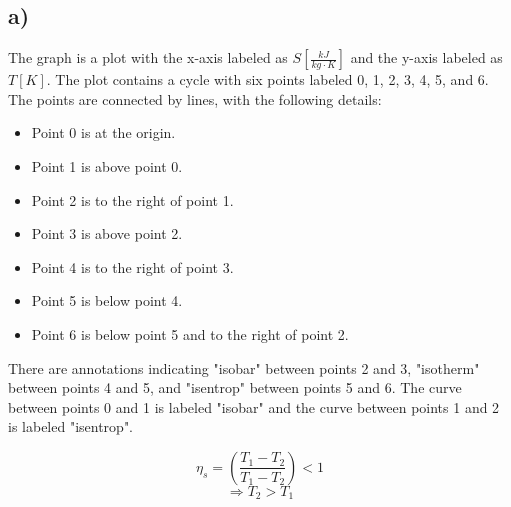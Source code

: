 

\subsection*{a)}

\begin{center}
\begin{minipage}{0.8\textwidth}
The graph is a plot with the x-axis labeled as $S \left[ \frac{kJ}{kg \cdot K} \right]$ and the y-axis labeled as $T \left[ K \right]$. The plot contains a cycle with six points labeled 0, 1, 2, 3, 4, 5, and 6. The points are connected by lines, with the following details:
\begin{itemize}
    \item Point 0 is at the origin.
    \item Point 1 is above point 0.
    \item Point 2 is to the right of point 1.
    \item Point 3 is above point 2.
    \item Point 4 is to the right of point 3.
    \item Point 5 is below point 4.
    \item Point 6 is below point 5 and to the right of point 2.
\end{itemize}
There are annotations indicating "isobar" between points 2 and 3, "isotherm" between points 4 and 5, and "isentrop" between points 5 and 6. The curve between points 0 and 1 is labeled "isobar" and the curve between points 1 and 2 is labeled "isentrop".
\end{minipage}
\end{center}

\[
\eta_s = \left( \frac{T_1 - T_2}{T_1 - T_2} \right) < 1
\]
\[
\Rightarrow T_2 > T_1
\]